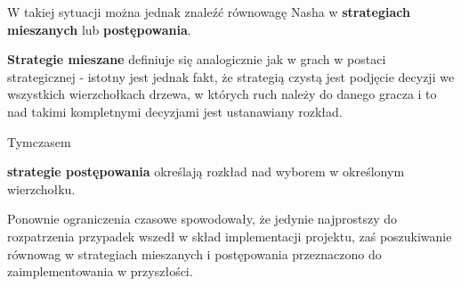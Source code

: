 \documentclass[polish]{standalone}
\begin{document}
W takiej sytuacji można jednak znaleźć równowagę Nasha w \textbf{strategiach mieszanych} lub \textbf{postępowania}.

\begin{definition}
\textbf{Strategie mieszane} definiuje się analogicznie jak w grach w postaci strategicznej - istotny jest jednak fakt,
że strategią czystą jest podjęcie decyzji we wszystkich wierzchołkach drzewa, w których ruch należy do danego gracza
i to nad takimi kompletnymi decyzjami jest ustanawiany rozkład.
\end{definition}

Tymczasem
\begin{definition}
\textbf{strategie postępowania}  określają rozkład nad wyborem w określonym wierzchołku.
\end{definition}

Ponownie ograniczenia czasowe spowodowały, że jedynie najprostszy do rozpatrzenia przypadek wszedł w skład implementacji
projektu, zaś poszukiwanie równowag w strategiach mieszanych i postępowania przeznaczono do zaimplementowania
w przyszłości.
\end{document}
